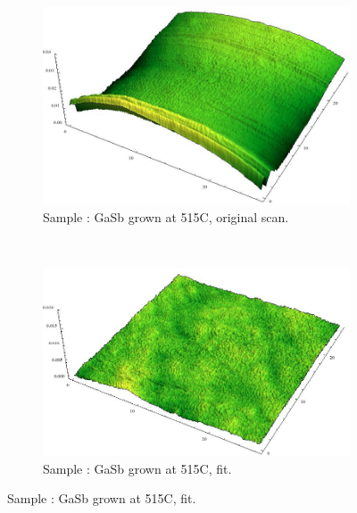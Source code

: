 \begin{figure}
    \begin{subfigure}{0.45\columnwidth}
         \includegraphics[width=\textwidth]{Bilder/s2_gasb_515c_orig.jpg}
         \caption{Sample : GaSb grown at 515\textdegree C, original 
         scan.}
        \label{s2_orig}
    \end{subfigure}
    ~
    \begin{subfigure}{0.45\columnwidth}
         \includegraphics[width=\textwidth]{Bilder/s2_gasb_515c_f.jpg}
         \caption{Sample : GaSb grown at 515\textdegree C, fit.}
        \label{s2_flat}
    \end{subfigure}
    

\end{figure}
